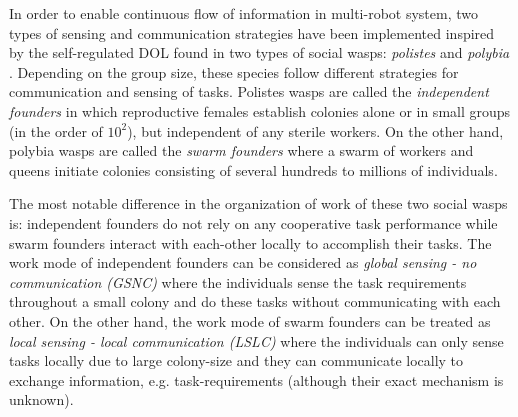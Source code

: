 In order to enable continuous flow of information in multi-robot system, two types of sensing and communication strategies have been implemented inspired by the self-regulated DOL found in two types of social wasps: {\em polistes} and {\em polybia} \cite{Jeanne1999}. Depending on the group size, these species follow different strategies for communication and sensing of tasks. Polistes wasps are called the {\em independent founders} in which reproductive females establish colonies alone or in small groups (in the order of $10^2$), but independent of any sterile workers. On the other hand, polybia wasps are called the {\em swarm founders} where a swarm of workers and queens initiate colonies consisting of several hundreds to millions of individuals.

The most notable difference in the organization of work of these two social wasps is: independent founders do not rely on any cooperative task performance while swarm founders interact with each-other locally to accomplish their tasks. The work mode of independent founders can be considered as {\em global sensing - no communication (GSNC)} where the individuals sense the task requirements throughout a small colony and do these tasks without communicating with each other. On the other hand, the work mode of swarm founders can be treated as {\em local sensing - local communication (LSLC)} where the individuals can only sense tasks locally due to large colony-size and they can communicate locally to exchange information, e.g. task-requirements (although their exact mechanism is unknown).

